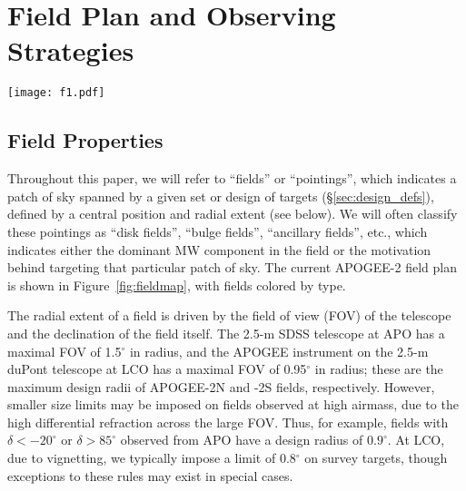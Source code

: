 \documentclass[12pt,twocolumn]{emulateapj}
\begin{document}
\section{Field Plan and Observing Strategies} 
\label{sec:fields}

\begin{figure*}
\begin{center}
\texttt{[image: f1.pdf]} %
\caption{The current APOGEE-2 field plan in Galactic coordinates, with fields colored by the primary driver of their placement.  The background grayscale is the integrated $E(B-V)$ map from \citet{Schlegel_1998_dustmap}; the concentration of APOGEE-2 observations in some of the dustiest parts of the Milky Way highlights the targeting advantage of NIR surveys compared to optical ones.  The dashed line indicates the approximate declination limit of $-10^\circ$ adopted for the Northern (upper, left) and Southern (lower, right)  survey components; fields with declinations within $\sim$15$^\circ$ of this line may be observed from either hemisphere. The gray meridians and parallels are spaced every $\Delta l,\Delta b = 30^\circ$.
}
\label{fig:fieldmap}
\end{center}
\end{figure*}


\subsection{Field Properties}
\label{sec:field_properties}

Throughout this paper, we will refer to ``fields'' or ``pointings'',
which indicates a patch of sky spanned by a given set or design of targets (\S\ref{sec:design_defs}), defined by a central position and radial extent (see below).  
We will often classify these pointings as ``disk fields'', ``bulge fields'', ``ancillary fields'', etc., 
which indicates either the dominant MW component in the field or the motivation behind targeting that particular patch of sky.
The current APOGEE-2 field plan is shown in Figure~\ref{fig:fieldmap}, with fields colored by type.

The radial extent of a field is driven by the field of view (FOV) of the telescope and the declination of the field itself.  The 2.5-m SDSS telescope at APO has a maximal FOV of 1.5$^\circ$ in radius, and the APOGEE instrument on the 2.5-m duPont telescope at LCO has a maximal FOV of 0.95$^\circ$ in radius; these are the maximum design radii of APOGEE-2N and -2S fields, respectively.  However, smaller size limits may be imposed on fields observed at high airmass, due to the high differential refraction across the large FOV.  Thus, for example, fields with $\delta < -20^\circ$ or $\delta > 85^\circ$ observed from APO have a design radius of $0.9^\circ$.  At LCO, due to vignetting, we typically impose a limit of 0.8$^\circ$ on survey targets, though exceptions to these rules may exist in special cases.
\end{document}

